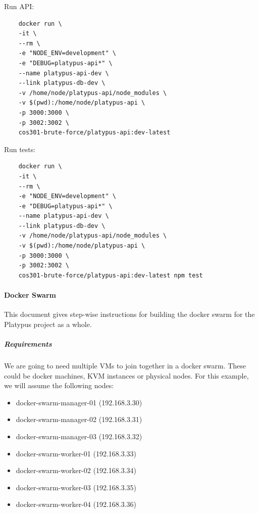 \documentclass[12pt,a4paper]{article}
\begin{document}
    \vspace{1cm}
	Run API:
	
	\begin{lstlisting}
	docker run \
  	-it \
  	--rm \
  	-e "NODE_ENV=development" \
  	-e "DEBUG=platypus-api*" \
  	--name platypus-api-dev \
  	--link platypus-db-dev \
  	-v /home/node/platypus-api/node_modules \
  	-v $(pwd):/home/node/platypus-api \
  	-p 3000:3000 \
  	-p 3002:3002 \
  	cos301-brute-force/platypus-api:dev-latest
	\end{lstlisting}
	
    \vspace{1cm}
	Run tests:

    \begin{lstlisting}
	docker run \
    -it \
    --rm \
    -e "NODE_ENV=development" \
    -e "DEBUG=platypus-api*" \
    --name platypus-api-dev \
    --link platypus-db-dev \
    -v /home/node/platypus-api/node_modules \
    -v $(pwd):/home/node/platypus-api \
    -p 3000:3000 \
    -p 3002:3002 \
    cos301-brute-force/platypus-api:dev-latest npm test
	\end{lstlisting}
	
    \vspace{1cm}
 
	\paragraph{Docker Swarm}
        This document gives step-wise instructions for building the docker swarm for the Platypus project as a whole.

	\subparagraph{Requirements}
	\subparagraph{}
	We are going to need multiple VMs to join together in a docker swarm. These
could be docker machines, KVM instances or physical nodes. For this
example, we will assume the following nodes:
\begin{itemize}
\item docker-swarm-manager-01 (192.168.3.30)
\item docker-swarm-manager-02 (192.168.3.31)
\item docker-swarm-manager-03 (192.168.3.32)
\item docker-swarm-worker-01 (192.168.3.33)
\item docker-swarm-worker-02 (192.168.3.34)
\item docker-swarm-worker-03 (192.168.3.35)
\item docker-swarm-worker-04 (192.168.3.36)
\end{itemize}
\end{document}
